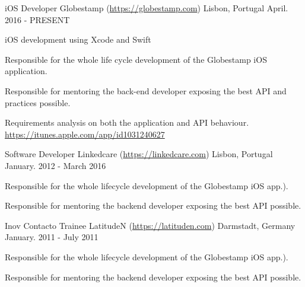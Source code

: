 

\begin{cventries}

  \cventry
    {iOS Developer} %
    {Globestamp (\url{https://globestamp.com}) } %
    {Lisbon, Portugal} %
    {April. 2016 - PRESENT} %
    {
      \begin{cvitems} %
      	\item{iOS development using Xcode and Swift}
        \item {Responsible for the whole life cycle development of the Globestamp iOS application.}
        \item {Responsible for mentoring the back-end developer exposing the best API and practices possible.}
        \item {Requirements analysis on both the application and API behaviour.\\}
		\url{https://itunes.apple.com/app/id1031240627}
      \end{cvitems}
    }

  \cventry
	{Software Developer} %
    {Linkedcare (\url{https://linkedcare.com}) } %
	{Lisbon, Portugal} %
	{January. 2012 - March 2016} %
	{
	 \begin{cvitems} %
		\item {Responsible for the whole lifecycle development of the Globestamp iOS app.).}
		\item {Responsible for mentoring the backend developer exposing the best API possible.}
	\end{cvitems}
	}

  \cventry
    {Inov Contacto Trainee } %
    {LatitudeN (\url{https://latituden.com}) } %
    {Darmstadt, Germany} %
    {January. 2011 - July 2011} %
    {
	\begin{cvitems} %
      	\item {Responsible for the whole lifecycle development of the Globestamp iOS app.).}
		 \item {Responsible for mentoring the backend developer exposing the best API possible.}
	\end{cvitems}
}

\end{cventries}
